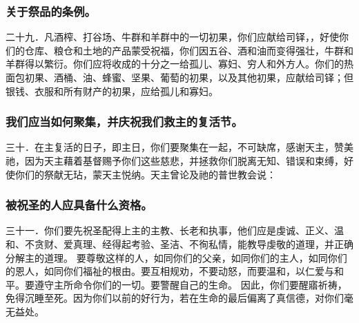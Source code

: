 
\subsubsection{关于祭品的条例。}

二十九．凡酒榨、打谷场、牛群和羊群中的一切初果，你们应献给司铎，，好使你们的仓库、粮仓和土地的产品蒙受祝福，你们因五谷、酒和油而变得强壮，牛群和羊群得以繁衍。你们应将收成的十分之一给孤儿、寡妇、穷人和外方人。你们的热面包初果、酒桶、油、蜂蜜、坚果、葡萄的初果，以及其他初果，应献给司铎；但银钱、衣服和所有财产的初果，应给孤儿和寡妇。\par


\subsubsection{我们应当如何聚集，并庆祝我们救主的复活节。}

三十．在主复活的日子，即主日，你们要聚集在一起，不可缺席，感谢天主，赞美祂，因为天主藉着基督赐予你们这些慈悲，并拯救你们脱离无知、错误和束缚，好使你们的祭献无玷，蒙天主悦纳。天主曾论及祂的普世教会说：\par


\subsubsection{被祝圣的人应具备什么资格。}

三十一．你们要先祝圣配得上主的主教、长老和执事，他们应是虔诚、正义、温和、不贪财、爱真理、经得起考验、圣洁、不徇私情，能教导虔敬的道理，并正确分解主的道理。 要尊敬这样的人，如同你们的父亲，如同你们的主人，如同你们的恩人，如同你们福祉的根由。要互相规劝，不要动怒，而要温和，以仁爱与和平。要遵守主所命令你们的一切。要警醒自己的生命。  因此，你们要醒寤祈祷，免得沉睡至死。因为你们以前的好行为，若在生命的最后偏离了真信德，对你们毫无益处。\par

